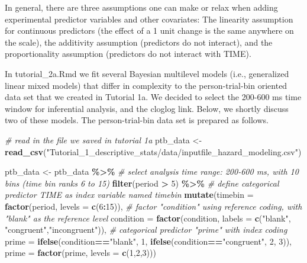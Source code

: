 \documentclass[
  man, donotrepeattitle,floatsintext]{apa6}
\newenvironment{Shaded}{\begin{snugshade}}{\end{snugshade}}
\newcommand{\AttributeTok}[1]{\textcolor[rgb]{0.13,0.29,0.53}{#1}}
\newcommand{\CommentTok}[1]{\textcolor[rgb]{0.56,0.35,0.01}{\textit{#1}}}
\newcommand{\DecValTok}[1]{\textcolor[rgb]{0.00,0.00,0.81}{#1}}
\newcommand{\FunctionTok}[1]{\textcolor[rgb]{0.13,0.29,0.53}{\textbf{#1}}}
\newcommand{\NormalTok}[1]{#1}
\newcommand{\OtherTok}[1]{\textcolor[rgb]{0.56,0.35,0.01}{#1}}
\newcommand{\SpecialCharTok}[1]{\textcolor[rgb]{0.81,0.36,0.00}{\textbf{#1}}}
\newcommand{\StringTok}[1]{\textcolor[rgb]{0.31,0.60,0.02}{#1}}
\begin{document}
In general, there are three assumptions one can make or relax when adding experimental predictor variables and other covariates: The linearity assumption for continuous predictors (the effect of a 1 unit change is the same anywhere on the scale), the additivity assumption (predictors do not interact), and the proportionality assumption (predictors do not interact with TIME).

In tutorial\_2a.Rmd we fit several Bayesian multilevel models (i.e., generalized linear mixed models) that differ in complexity to the person-trial-bin oriented data set that we created in Tutorial 1a. We decided to select the 200-600 ms time window for inferential analysis, and the cloglog link. Below, we shortly discuss two of these models. The person-trial-bin data set is prepared as follows.

\footnotesize

\begin{Shaded}
\begin{Highlighting}[]
\CommentTok{\# read in the file we saved in tutorial 1a}
\NormalTok{ptb\_data }\OtherTok{\textless{}{-}} \FunctionTok{read\_csv}\NormalTok{(}\StringTok{"Tutorial\_1\_descriptive\_stats/data/inputfile\_hazard\_modeling.csv"}\NormalTok{)}

\NormalTok{ptb\_data }\OtherTok{\textless{}{-}}\NormalTok{ ptb\_data }\SpecialCharTok{\%\textgreater{}\%} 
\CommentTok{\# select analysis time range: 200{-}600 ms, with 10 bins (time bin ranks 6 to 15)}
\FunctionTok{filter}\NormalTok{(period }\SpecialCharTok{\textgreater{}} \DecValTok{5}\NormalTok{) }\SpecialCharTok{\%\textgreater{}\%}
       \CommentTok{\# define categorical predictor TIME as index variable named timebin}
\FunctionTok{mutate}\NormalTok{(}\AttributeTok{timebin =} \FunctionTok{factor}\NormalTok{(period, }\AttributeTok{levels =} \FunctionTok{c}\NormalTok{(}\DecValTok{6}\SpecialCharTok{:}\DecValTok{15}\NormalTok{)),}
       \CommentTok{\# factor "condition" using reference coding, with "blank" as the reference level}
       \AttributeTok{condition =} \FunctionTok{factor}\NormalTok{(condition, }\AttributeTok{labels =} \FunctionTok{c}\NormalTok{(}\StringTok{"blank"}\NormalTok{, }\StringTok{"congruent"}\NormalTok{,}\StringTok{"incongruent"}\NormalTok{)),}
       \CommentTok{\# categorical predictor "prime" with index coding}
       \AttributeTok{prime =} \FunctionTok{ifelse}\NormalTok{(condition}\SpecialCharTok{==}\StringTok{"blank"}\NormalTok{, }\DecValTok{1}\NormalTok{, }\FunctionTok{ifelse}\NormalTok{(condition}\SpecialCharTok{==}\StringTok{"congruent"}\NormalTok{, }\DecValTok{2}\NormalTok{, }\DecValTok{3}\NormalTok{)),}
       \AttributeTok{prime =} \FunctionTok{factor}\NormalTok{(prime, }\AttributeTok{levels =} \FunctionTok{c}\NormalTok{(}\DecValTok{1}\NormalTok{,}\DecValTok{2}\NormalTok{,}\DecValTok{3}\NormalTok{)))}
\end{Highlighting}
\end{Shaded}
\end{document}
